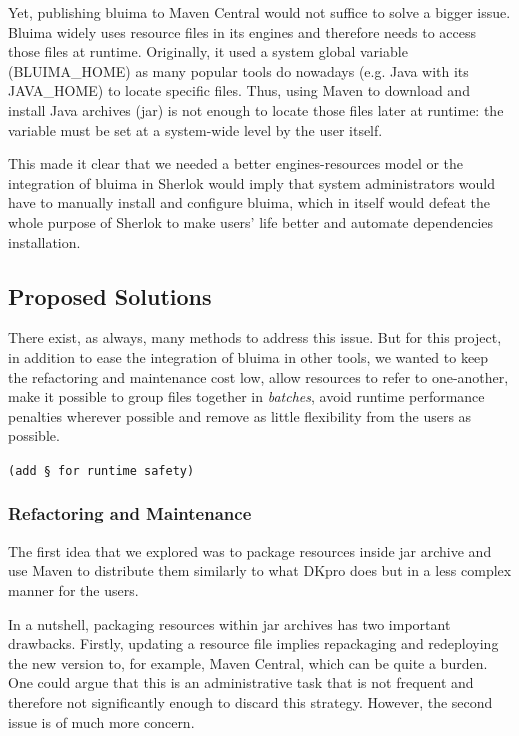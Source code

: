 \documentclass{article}
\newcommand{\ID}[1]{{\textsc{#1}}}
\newcommand{\TODO}[1]{\texttt{\textcolor{YellowOrange}{(#1)}}} %
\begin{document}
Yet, publishing bluima to Maven Central would not suffice to solve a bigger issue. Bluima widely
uses resource files in its engines and therefore needs to access those files at runtime. Originally,
it used a system global variable (\ID{BLUIMA\_HOME}) as many popular tools do nowadays (e.g. Java
with its \ID{JAVA\_HOME}) to locate specific files. Thus, using Maven to download and install Java
archives (jar) is not enough to locate those files later at runtime: the variable must be set at a
system-wide level by the user itself.

This made it clear that we needed a better engines-resources model or the integration of bluima in
Sherlok would imply that system administrators would have to manually install and configure bluima,
which in itself would defeat the whole purpose of Sherlok to make users' life better and automate
dependencies installation.

\subsection{Proposed Solutions}

There exist, as always, many methods to address this issue. But for this project, in addition to
ease the integration of bluima in other tools, we wanted to keep the refactoring and maintenance
cost low, allow resources to refer to one-another, make it possible to group files together in
\emph{batches}, avoid runtime performance penalties wherever possible and remove as little
flexibility from the users as possible.

\TODO{add § for runtime safety}

\subsubsection{Refactoring and Maintenance}

The first idea that we explored was to package resources inside jar archive and use Maven to
distribute them similarly to what DKpro \cite{dkpro} does but in a less complex manner for the
users.

In a nutshell, packaging resources within jar archives has two important drawbacks. Firstly,
updating a resource file implies repackaging and redeploying the new version to, for example, Maven
Central, which can be quite a burden. One could argue that this is an administrative task that is
not frequent and therefore not significantly enough to discard this strategy. However, the second
issue is of much more concern.
\end{document}
